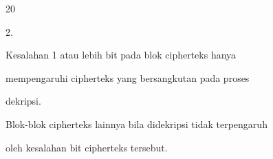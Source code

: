 \documentclass{article}
\begin{document}

20

2.

Kesalahan 1 atau lebih bit pada blok cipherteks hanya 

mempengaruhi cipherteks yang bersangkutan pada proses 

dekripsi. 


Blok-blok cipherteks lainnya bila didekripsi tidak terpengaruh 

oleh kesalahan bit cipherteks tersebut.
\end{document}
